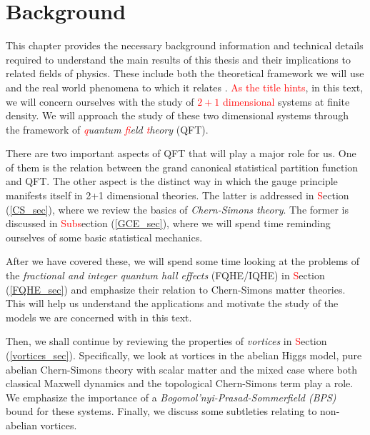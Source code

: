 
    \graphicspath{{Background_Folder/figures/PNG/}{Background_Folder/figures/PDF/}{Background_Folder/figures/}}

\chapter{Background}
This chapter provides the necessary background information and technical details required to understand the main results of this thesis and their implications to related fields of physics. These include both the theoretical framework we will use and the real world phenomena to which it relates \colorbox{red}{ }. \textcolor{red}{As the title hints}, in this text, we will concern ourselves with the study of \textcolor{red}{$2+1$ dimensional} systems at finite density. We will approach the study of these two dimensional systems through the framework of \textit{\textcolor{red}{q}uantum \textcolor{red}{f}ield \textcolor{red}{t}heory} (QFT). 

    There are two important aspects of QFT that will play a major role for us. One of them is the relation between the grand canonical statistical partition function and QFT. The other aspect is the distinct way in which the gauge principle manifests itself in 2+1 dimensional theories. The latter is addressed in \textcolor{red}{S}ection (\ref{CS_sec}), where we review the basics of \textit{Chern-Simons theory}. The former is discussed in \textcolor{red}{Subs}ection (\ref{GCE_sec}), where we will spend time reminding ourselves of some basic statistical mechanics. 


    After we have covered these, we will spend some time looking at the problems of the \textit{fractional and integer quantum hall effects} (FQHE/IQHE) in \textcolor{red}{S}ection (\ref{FQHE_sec}) and emphasize their relation to Chern-Simons matter theories. This will help us understand the applications and motivate the study of the models we are concerned with in this text.

    Then, we shall continue by reviewing the properties of \textit{vortices} in \textcolor{red}{S}ection (\ref{vortices_sec}). Specifically, we look at vortices in the abelian Higgs model, pure abelian Chern-Simons theory with scalar matter and the mixed case where both classical Maxwell dynamics and the topological Chern-Simons term play a role. We emphasize the importance of a \textit{Bogomol'nyi-Prasad-Sommerfield (BPS)} \cite{Bogomolny:1975de, Prasad:1975kr} bound for these systems. Finally, we discuss some subtleties relating to non-abelian vortices.

